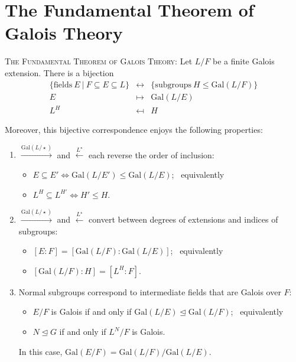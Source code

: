 \documentclass[12pt]{amsart}
\newcommand{\showsol}[1]{\def\displaysol{#1}}
\begin{document}
\showsol{0}
	
	\thispagestyle{empty}
	
	\section*{The Fundamental Theorem of Galois Theory}
	\begin{framed}
	\textsc{The Fundamental Theorem of Galois Theory:} 
	Let $L/F$ be a finite Galois extension. There is a bijection 
	\[ \begin{array}{ccccc} & \{ \text{fields} \ E \ | \ F\subseteq E \subseteq L \} &\longleftrightarrow & \{ \text{subgroups} \ H \leq \mathrm{Gal}(L/F) \} & \\
	& E & {\mapsto} & \mathrm{Gal}(L/E) & \\
	& L^H & {\mapsfrom} & H &
	\end{array}\]

Moreover, this bijective correspondence enjoys the following properties:
\begin{enumerate}
\item $\stackrel{\mathrm{Gal}(L/\star)}{\longrightarrow}$ and $\stackrel{L^{\star}}{\longleftarrow}$ each reverse the order of inclusion: 
\begin{itemize}
\item[] $E \subseteq E' \Longleftrightarrow \mathrm{Gal}(L/E') \leq \mathrm{Gal}(L/E)$; \ equivalently
\item[] $L^H \subseteq L^{H'} \Longleftrightarrow H' \leq H$.
\end{itemize}
\item $\stackrel{\mathrm{Gal}(L/\star)}{\longrightarrow}$ and $\stackrel{L^{\star}}{\longleftarrow}$ convert between degrees of extensions and indices of subgroups:  
\begin{itemize}
\item[] $[E:F] = [\mathrm{Gal}(L/F) : \mathrm{Gal}(L/E)]$; \ equivalently
\item[] $[\mathrm{Gal}(L/F) : H] = [L^H:F]$.
\end{itemize}
\item Normal subgroups correspond to intermediate fields that are Galois over $F$: 
\begin{itemize}
\item[] $E/F$ is Galois if and only if $\mathrm{Gal}(L/E) \trianglelefteq \mathrm{Gal}(L/F)$; \ equivalently
\item[] $N \trianglelefteq G$ if and only if $L^N/F$ is Galois.
\end{itemize}
In this case, $\mathrm{Gal}(E/F) = \mathrm{Gal}(L/F) / \mathrm{Gal}(L/E)$.
\end{enumerate}
		\end{framed}
\end{document}
